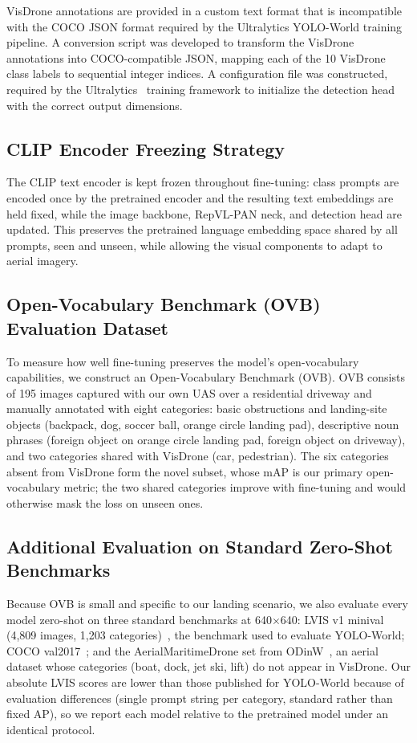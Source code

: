 \documentclass[conf]{new-aiaa}
\begin{document}
VisDrone annotations are provided in a custom text format that is incompatible with the COCO JSON format required by the Ultralytics YOLO-World training pipeline. A conversion script was developed to transform the VisDrone annotations into COCO-compatible JSON, mapping each of the 10 VisDrone class labels to sequential integer indices. A configuration file was constructed, required by the Ultralytics~\cite{ultralytics2023} training framework to initialize the detection head with the correct output dimensions.

\subsection{CLIP Encoder Freezing Strategy}

The CLIP text encoder is kept frozen throughout fine-tuning: class prompts are encoded once
by the pretrained encoder and the resulting text embeddings are held fixed, while the image
backbone, RepVL-PAN neck, and detection head are updated. This preserves the pretrained
language embedding space shared by all prompts, seen and unseen, while allowing the visual
components to adapt to aerial imagery.

\subsection{Open-Vocabulary Benchmark (OVB) Evaluation Dataset}

To measure how well fine-tuning preserves the model's open-vocabulary capabilities, we
construct an Open-Vocabulary Benchmark (OVB). OVB consists of 195 images captured with our own
UAS over a residential driveway and manually annotated with eight categories: basic
obstructions and landing-site objects (backpack, dog, soccer ball, orange circle landing pad),
descriptive noun phrases (foreign object on orange circle landing pad, foreign object on
driveway), and two categories shared with VisDrone (car, pedestrian). The six categories absent
from VisDrone form the novel subset, whose mAP is our primary open-vocabulary metric; the two
shared categories improve with fine-tuning and would otherwise mask the loss on unseen ones.

\subsection{Additional Evaluation on Standard Zero-Shot Benchmarks}

Because OVB is small and specific to our landing scenario, we also evaluate every model
zero-shot on three standard benchmarks at 640$\times$640: LVIS v1 minival (4,809 images,
1,203 categories)~\cite{gupta2019lvis}, the benchmark used to evaluate YOLO-World; COCO
val2017~\cite{lin2014coco}; and the AerialMaritimeDrone set from ODinW~\cite{li2022glip},
an aerial dataset whose categories (boat, dock, jet ski, lift) do not appear in VisDrone. Our
absolute LVIS scores are lower than those published for YOLO-World because of evaluation
differences (single prompt string per category, standard rather than fixed AP), so we report
each model relative to the pretrained model under an identical protocol.
\end{document}

